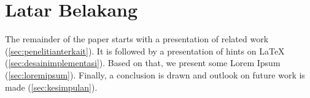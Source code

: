 \section{Latar Belakang}
\label{sec:latarbelakang}

\lipsum[1-3]

The remainder of the paper starts with a presentation of related work (\cref{sec:penelitianterkait}).
It is followed by a presentation of hints on \LaTeX{} (\cref{sec:desainimplementasi}).
Based on that, we present some Lorem Ipsum (\cref{sec:loremipsum}).
Finally, a conclusion is drawn and outlook on future work is made (\cref{sec:kesimpulan}).
